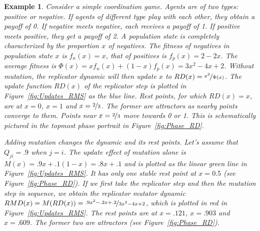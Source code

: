 \documentclass[a4paper, 11pt]{article}
\theoremstyle{Satz}
\newtheorem{example}{Example}
\begin{document}
\begin{example}
  Consider a simple coordination game. Agents are of two types: positive or negative. If
  agents of different type play with each other, they obtain a payoff of 0. If negative meets
  negative, each receives a payoff of 1. If positive meets positive, they get a payoff of 2. A
  population state is completely characterized by the proportion $x$ of negatives. The fitness
  of negatives in population state $x$ is $f_n(x) = x$, that of positives is $f_p(x) = 2-2x$.
  The average fitness is $\Phi(x) = x f_n(x) + (1-x) f_p(x) = 3x^2 - 4x + 2$. Without mutation,
  the replicator dynamic will then update $x$ to $RD(x) = \nicefrac{x^2}{\Phi(x)}$. The update
  function $RD(x)$ of the replicator step is plotted in Figure~\ref{fig:Updates_RMS} as the
  blue line. Rest points, for which $RD(x)=x$, are at $x=0$, $x=1$ and $x= \nicefrac{2}{3}$.
  The former are attractors as nearby points converge to them. Points near $x=\nicefrac{2}{3}$
  move towards 0 or 1. This is schematically pictured in the topmost phase portrait in
  Figure~\ref{fig:Phase_RD}.

  Adding mutation changes the dynamic and its rest points. Let's assume that $Q_{ji} = .9$
  when $j=i$. The update effect of mutation alone is $M(x) = .9 x + .1 (1-x) = .8x + .1$ and is
  plotted as the linear green line in Figure~\ref{fig:Updates_RMS}. It has only one stable rest
  point at $x = 0.5$ (see Figure~\ref{fig:Phase_RD}). If we first take the replicator step and
  then the mutation step in sequence, we obtain the replicator mutator dynamic
  $RMD(x) = M(RD(x)) = \nicefrac{.9x^2 - .2x +.2}{3x^2 - 4x + 2}$, which is plotted in red in
  Figure~\ref{fig:Updates_RMS}. The rest points are at $x=.121$, $x=.903$ and $x=.609$. The
  former two are attractors (see Figure~\ref{fig:Phase_RD}).
\end{example}
\end{document}
